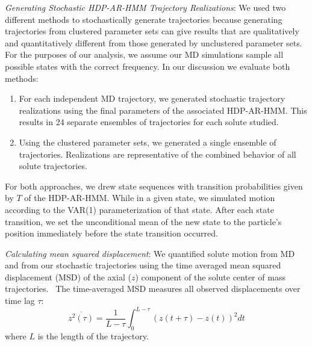 \documentclass[journal=jpcbfk,manuscript=article]{achemso}
\begin{document}
  \textit{Generating Stochastic HDP-AR-HMM Trajectory Realizations}: We used two 
  different methods to stochastically generate trajectories because generating
  trajectories from clustered parameter sets can give results that are qualitatively 
  and quantitatively different from those generated by unclustered parameter sets.
  For the purposes of our analysis,
  we assume our MD simulations sample all possible states with the correct 
  frequency.
  In our discussion we evaluate both methods:
  \begin{enumerate}[label={Method \theenumi :}, leftmargin=3.5\parindent]
    \item For each independent MD trajectory, we generated stochastic trajectory
    realizations using the final parameters of the associated HDP-AR-HMM. This 
    results in 24 separate ensembles of trajectories for each solute studied.
    \item Using the clustered parameter sets, we generated a single ensemble
	of trajectories. Realizations are representative of the combined behavior
	of all solute trajectories.
  \end{enumerate}
  
  For both approaches, we drew state sequences with transition probabilities given 
  by $T$ of the HDP-AR-HMM. While in a given state, we simulated motion according to the 
  VAR(1) parameterization of that state. After each state transition, we set the 
  unconditional mean of the new state to the particle's position immediately before
  the state transition occurred.
  
  \textit{Calculating mean squared displacement}: We quantified solute motion from
  MD and from our stochastic trajectories using the time averaged mean squared 
  displacement (MSD) of the axial ($z$) component of the solute center of mass
  trajectories.~\cite{meroz_toolbox_2015} The time-averaged MSD measures all observed 
  displacements over time lag $\tau$:
  \begin{equation}
  	\overline{z^2(\tau)} = \dfrac{1}{L - \tau}\int_{0}^{L - \tau} (z(t + \tau) - z(t))^2 dt
  \label{eqn:tamsd}
  \end{equation}
  where $L$ is the length of the trajectory. 
  
\end{document}
